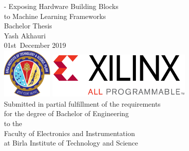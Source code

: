 
\cleardoublepage{}

\thispagestyle{empty}
{
    \calccentering{\unitlength}
    \begin{adjustwidth*}{\unitlength}{-\unitlength}
        \raggedleft{}
        {\Huge\color{Burgundy}%
        Exposing Hardware Building Blocks\\
        to Machine Learning Frameworks}\\[\baselineskip]
        {\LARGE%
        Bachelor Thesis}\\[0.1\textheight]
        {\Huge%
        Yash Akhauri}\\[\baselineskip]
        {\LARGE%
        01st~December 2019}
        \\[32pt]
        \vfill
        \includegraphics[width=70pt]{figures/bison/birla.png} 
        \hfill
        \includegraphics[width=200pt]{figures/bison/xilinx.jpg}
        \\[32pt]
        \vfill
            {\large%
            Submitted in partial fulfillment of the requirements\\
            for the degree of Bachelor of Engineering\\[\baselineskip]%
    
            to the\\[\baselineskip]
    
            Faculty of Electronics and Instrumentation\\
            at Birla Institute of Technology and Science\\[2\baselineskip]
    
}
\end{adjustwidth*}}
